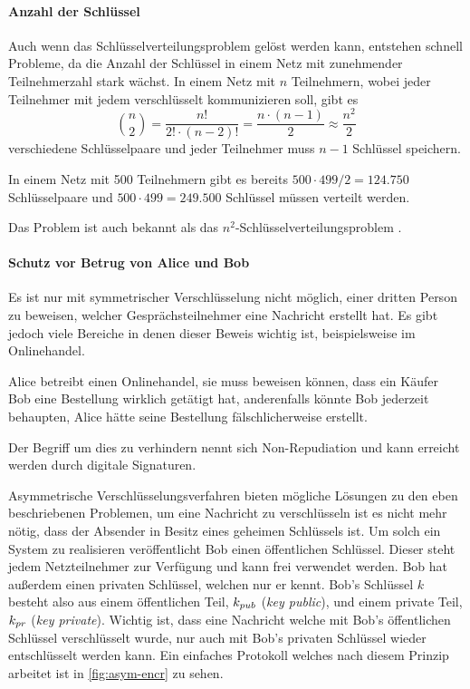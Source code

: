 \paragraph{Anzahl der Schlüssel}
Auch wenn das Schlüsselverteilungsproblem gelöst werden kann, entstehen
schnell Probleme, da die Anzahl der Schlüssel in einem
Netz mit zunehmender Teilnehmerzahl stark wächst. In einem Netz mit $n$
Teilnehmern, wobei jeder Teilnehmer mit jedem verschlüsselt kommunizieren soll, gibt es
\begin{equation*}
  \binom{n}{2} = \frac{n!}{2! \cdot (n-2)!} = \frac{n\cdot(n-1)}{2} \approx \frac{n^2}{2}
\end{equation*}
verschiedene Schlüsselpaare und jeder Teilnehmer muss $n-1$ Schlüssel speichern.
\begin{example}
  In einem Netz mit 500 Teilnehmern gibt es bereits $500 \cdot 499 / 2 = 124.750$ Schlüsselpaare
  und $500 \cdot 499 = 249.500$ Schlüssel müssen verteilt werden.
\end{example}
\noindent
Das Problem ist auch bekannt als das
$n^2$-Schlüsselverteilungsproblem \parencite[334-335]{BOOK:crypto}.

\paragraph{Schutz vor Betrug von Alice und Bob}
Es ist nur mit symmetrischer Verschlüsselung nicht möglich, einer dritten Person
zu beweisen, welcher Gesprächsteilnehmer eine Nachricht erstellt hat.
Es gibt jedoch viele Bereiche in denen dieser Beweis wichtig ist, beispielsweise
im Onlinehandel.
\begin{example}
  Alice betreibt einen Onlinehandel, sie muss beweisen können, dass ein
  Käufer Bob eine Bestellung wirklich getätigt hat, anderenfalls könnte Bob jederzeit behaupten,
  Alice hätte seine Bestellung fälschlicherweise erstellt.
\end{example}
\noindent
Der Begriff um dies zu verhindern nennt sich Non-Repudiation \parencite{SITE:nonrepudiation}
und kann erreicht werden durch digitale Signaturen.
\par
Asymmetrische Verschlüsselungsverfahren bieten mögliche Lösungen zu den eben
beschriebenen Problemen, um eine Nachricht zu verschlüsseln ist es nicht mehr nötig,
dass der Absender in Besitz eines geheimen Schlüssels ist. Um solch ein System zu
realisieren veröffentlicht Bob einen öffentlichen Schlüssel. Dieser steht jedem Netzteilnehmer
zur Verfügung und kann frei verwendet werden.
Bob hat außerdem einen privaten Schlüssel, welchen nur er kennt.
Bob's Schlüssel $k$ besteht also aus einem öffentlichen Teil, $k_{pub}{}$ (\textit{key public}),
und einem private Teil, $k_{pr}{}$ (\textit{key private}). Wichtig ist, dass eine Nachricht
welche mit Bob's öffentlichen Schlüssel verschlüsselt wurde, nur auch mit Bob's privaten
Schlüssel wieder entschlüsselt werden kann. Ein einfaches Protokoll
welches nach diesem Prinzip arbeitet ist in \autoref{fig:asym-encr} zu sehen.

